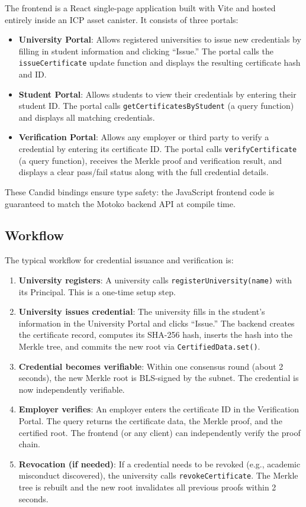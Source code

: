 \documentclass[journal]{IEEEtran}
\begin{document}
The frontend is a React single-page application built with Vite and hosted entirely inside an ICP asset canister. It consists of three portals:

\begin{itemize}[leftmargin=*]
  \item \textbf{University Portal}: Allows registered universities to issue new credentials by filling in student information and clicking ``Issue.'' The portal calls the \texttt{issueCertificate} update function and displays the resulting certificate hash and ID.
  \item \textbf{Student Portal}: Allows students to view their credentials by entering their student ID. The portal calls \texttt{getCertificatesByStudent} (a query function) and displays all matching credentials.
  \item \textbf{Verification Portal}: Allows any employer or third party to verify a credential by entering its certificate ID. The portal calls \texttt{verifyCertificate} (a query function), receives the Merkle proof and verification result, and displays a clear pass/fail status along with the full credential details.
\end{itemize}

These Candid bindings ensure type safety: the JavaScript frontend code is guaranteed to match the Motoko backend API at compile time.

\subsection{Workflow}

The typical workflow for credential issuance and verification is:

\begin{enumerate}
  \item \textbf{University registers}: A university calls \texttt{registerUniversity(name)} with its Principal. This is a one-time setup step.
  \item \textbf{University issues credential}: The university fills in the student's information in the University Portal and clicks ``Issue.'' The backend creates the certificate record, computes its SHA-256 hash, inserts the hash into the Merkle tree, and commits the new root via \texttt{CertifiedData.set()}.
  \item \textbf{Credential becomes verifiable}: Within one consensus round (about 2 seconds), the new Merkle root is BLS-signed by the subnet. The credential is now independently verifiable.
  \item \textbf{Employer verifies}: An employer enters the certificate ID in the Verification Portal. The query returns the certificate data, the Merkle proof, and the certified root. The frontend (or any client) can independently verify the proof chain.
  \item \textbf{Revocation (if needed)}: If a credential needs to be revoked (e.g., academic misconduct discovered), the university calls \texttt{revokeCertificate}. The Merkle tree is rebuilt and the new root invalidates all previous proofs within 2 seconds.
\end{enumerate}
\end{document}
